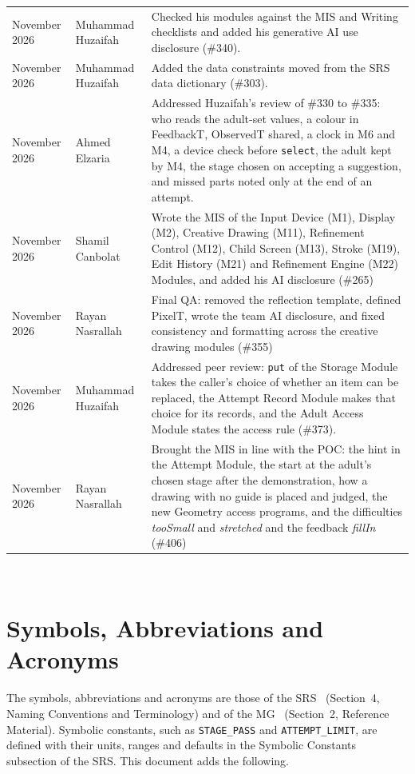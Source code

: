 \documentclass[12pt, titlepage]{article}
\begin{document}
{\begin{tabularx}{\textwidth}{>{\raggedright\arraybackslash}p{3cm}
>{\raggedright\arraybackslash}p{3.3cm}>{\raggedright\arraybackslash}X}
11 November 2026 & Muhammad Huzaifah & Checked his modules against the MIS and
Writing checklists and added his generative AI use disclosure (\#340).\\
11 November 2026 & Muhammad Huzaifah & Added the data constraints moved from the
SRS data dictionary (\#303).\\
13 November 2026 & Ahmed Elzaria & Addressed Huzaifah's review of \#330 to
\#335: who reads the adult-set values, a colour in FeedbackT, ObservedT shared,
a clock in M6 and M4, a device check before \texttt{select}, the adult kept by
M4, the stage chosen on accepting a suggestion, and missed parts noted only at
the end of an attempt.\\
14 November 2026 & Shamil Canbolat & Wrote the MIS of the Input Device (M1),
Display (M2), Creative Drawing (M11), Refinement Control (M12), Child Screen
(M13), Stroke (M19), Edit History (M21) and Refinement Engine (M22) Modules,
and added his AI disclosure (\#265)\\
14 November 2026 & Rayan Nasrallah & Final QA: removed the reflection
template, defined PixelT, wrote the team AI disclosure, and fixed consistency
and formatting across the creative drawing modules (\#355)\\
24 November 2026 & Muhammad Huzaifah & Addressed peer review: \texttt{put} of
the Storage Module takes the caller's choice of whether an item can be
replaced, the Attempt Record Module makes that choice for its records, and the
Adult Access Module states the access rule (\#373).\\
25 November 2026 & Rayan Nasrallah & Brought the MIS in line with the POC:
the hint in the Attempt Module, the start at the adult's chosen stage after the
demonstration, how a drawing with no guide is placed and judged, the new
Geometry access programs, and the difficulties \emph{tooSmall} and
\emph{stretched} and the feedback \emph{fillIn} (\#406)\\
\bottomrule
\end{tabularx}
}

~\newpage

\section{Symbols, Abbreviations and Acronyms}

The symbols, abbreviations and acronyms are those of the SRS~\citep{SRS}
(Section~4, Naming Conventions and Terminology) and of the
MG~\citep{MG} (Section~2, Reference Material). Symbolic constants, such as
\texttt{STAGE\_PASS} and \texttt{ATTEMPT\_LIMIT}, are defined with their units,
ranges and defaults in the Symbolic Constants subsection of the SRS. This
document adds the following.
\end{document}
